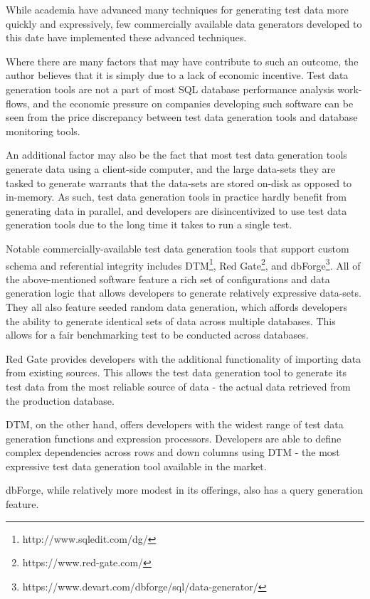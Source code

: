\documentclass[12pt]{report}
\begin{document}
\begin{spacing}{1.9}
		While academia have advanced many techniques for generating test data more quickly and expressively, few commercially available data generators developed to this date have implemented these advanced techniques.
		
		Where there are many factors that may have contribute to such an outcome, the author believes that it is simply due to a lack of economic incentive. Test data generation tools are not a part of most SQL database performance analysis work-flows, and the economic pressure on companies developing such software can be seen from the price discrepancy between test data generation tools and database monitoring tools.
		
		An additional factor may also be the fact that most test data generation tools generate data using a client-side computer, and the large data-sets they are tasked to generate warrants that the data-sets are stored on-disk as opposed to in-memory. As such, test data generation tools in practice hardly benefit from generating data in parallel, and developers are disincentivized to use test data generation tools due to the long time it takes to run a single test.
		
		Notable commercially-available test data generation tools that support custom schema and referential integrity includes DTM\footnote{http://www.sqledit.com/dg/}, Red Gate\footnote{https://www.red-gate.com/}, and dbForge\footnote{https://www.devart.com/dbforge/sql/data-generator/}. All of the above-mentioned software feature a rich set of configurations and data generation logic that allows developers to generate relatively expressive data-sets. They all also feature seeded random data generation, which affords developers the ability to generate identical sets of data across multiple databases. This allows for a fair benchmarking test to be conducted across databases.
		
		Red Gate provides developers with the additional functionality of importing data from existing sources. This allows the test data generation tool to generate its test data from the most reliable source of data - the actual data retrieved from the production database.
		
		DTM, on the other hand, offers developers with the widest range of test data generation functions and expression processors. Developers are able to define complex dependencies across rows and down columns using DTM - the most expressive test data generation tool available in the market. 
		
		dbForge, while relatively more modest in its offerings, also has a query generation feature.
		

\end{spacing}
\end{document}
